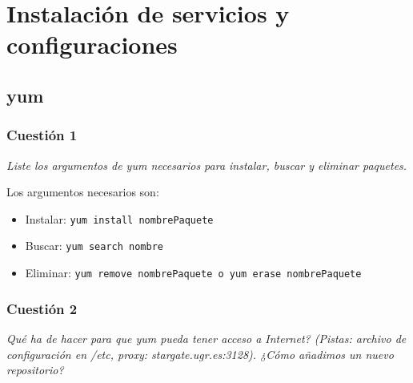 



\maketitle %
\newpage %
\tableofcontents %
\listoffigures
\listoftables
\newpage


\section{Instalación de servicios y configuraciones}

\subsection{yum}



\subsubsection{Cuestión 1}
\textit{Liste los argumentos de yum necesarios para instalar, buscar y eliminar paquetes.}
\newline

Los argumentos necesarios son: \cite{manyum}
\begin{itemize}
  \item Instalar: \texttt{yum install nombrePaquete}
  \item Buscar: \texttt{yum search nombre}
  \item Eliminar: \texttt{yum remove nombrePaquete o yum erase nombrePaquete}
\end{itemize}



\subsubsection{Cuestión 2}
\textit{Qué ha de hacer para que yum pueda tener acceso a Internet? (Pistas: archivo de configuración en /etc, proxy: stargate.ugr.es:3128). ¿Cómo añadimos un nuevo repositorio?}
\newline

